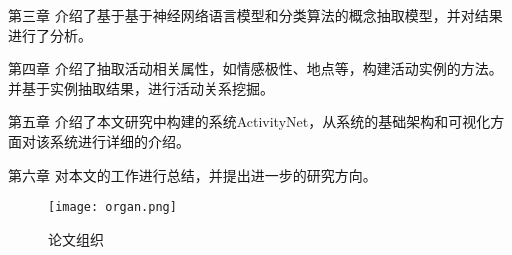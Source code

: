 {\heiti 第三章} 介绍了基于基于神经网络语言模型和分类算法的概念抽取模型，并对结果进行了分析。

{\heiti 第四章} 介绍了抽取活动相关属性，如情感极性、地点等，构建活动实例的方法。并基于实例抽取结果，进行活动关系挖掘。

{\heiti 第五章} 介绍了本文研究中构建的系统ActivityNet，从系统的基础架构和可视化方面对该系统进行详细的介绍。

{\heiti 第六章} 对本文的工作进行总结，并提出进一步的研究方向。

\begin{figure}[!h]
\caption{论文组织}
\label{fig:organ}
\begin{center}
\texttt{[image: organ.png]}
\end{center}
\end{figure}

